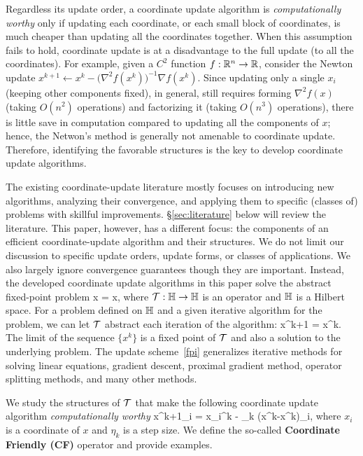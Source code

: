 Regardless its update order, a coordinate update algorithm is \emph{computationally worthy} only if updating each coordinate, or each small block of coordinates, is much cheaper than updating all the coordinates together. When this assumption fails to hold, coordinate update is at a disadvantage to the full update (to all the coordinates). For example, given a $C^2$ function $f:\mathbb{R}^n\to \mathbb{R}$, consider the Newton update  $x^{k+1} \gets x^k - \big(\nabla^2 f(x^k)\big)^{-1}\nabla f(x^k)$. Since updating only a single $x_i$ (keeping other components fixed), in general, still requires forming $\nabla^2 f(x)$ (taking $O(n^2)$ operations) and factorizing it (taking $O(n^3)$ operations), there is little save in computation compared to updating all the components of $x$; hence, the Netwon's method is generally not amenable to coordinate update.  Therefore, identifying the favorable structures is the key to develop coordinate update algorithms.

The existing coordinate-update literature mostly focuses on introducing new algorithms, analyzing their convergence, and applying them to specific (classes of) problems with skillful improvements. \S\ref{sec:literature} below will review the literature. This paper, however, has a different focus:  the  components of  an efficient coordinate-update algorithm and their structures. We do not limit our discussion to specific update orders, update forms,  or classes of applications. We also largely ignore convergence guarantees  though they are important. Instead,   
the developed coordinate update algorithms in this paper %
solve the abstract fixed-point problem
\beq\label{fpprob}
x = \cT x,
\eeq
where  ${\mathcal{T}}:\mathbb{H} \to \mathbb{H}$ is an operator and $\mathbb{H}$ is a Hilbert space. 
For a  problem defined on $\mathbb{H}$ and a given iterative algorithm for the problem,  we can let  ${\mathcal{T}}$ abstract each iteration of the algorithm:
\beq\label{fpi}
x^{k+1} = \cT x^k.
\eeq
The limit of the sequence $\{x^k\}$  is a fixed point of ${\mathcal{T}}$ and also a solution to the underlying problem. The update scheme~\eqref{fpi} generalizes iterative methods for solving linear equations, gradient descent, proximal gradient method,  operator splitting methods, and many other methods.

We study the structures of ${\mathcal{T}}$ that make the  following coordinate update algorithm \emph{computationally worthy}
\beq\label{cuitr}
x^{k+1}_i = x_i^k - \eta_k (x^k-\cT x^k)_i,
\eeq
where $x_i$ is a coordinate of $x$ and $\eta_k$ is a  step size. We define the so-called \textbf{Coordinate Friendly (CF)} operator and provide examples. 

